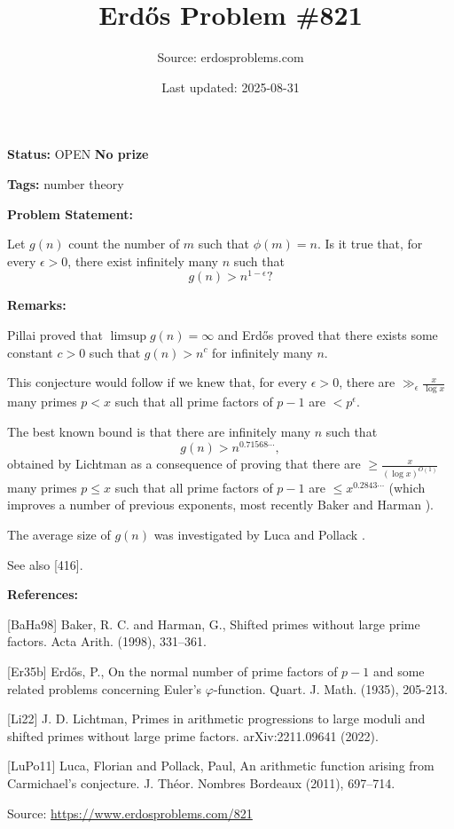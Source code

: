 \documentclass{article}
\title{Erd\H{o}s Problem \#821}
\date{Last updated: 2025-08-31}
\author{Source: erdosproblems.com}
\begin{document}
\maketitle

\noindent\textbf{Status:} OPEN \quad \textbf{No prize}

\noindent\textbf{Tags:} number theory

\medskip
\noindent\textbf{Problem Statement:}

Let $g(n)$ count the number of $m$ such that $\phi(m)=n$. Is it true that, for every $\epsilon>0$, there exist infinitely many $n$ such that\[g(n) > n^{1-\epsilon}?\]

\bigskip
\noindent\textbf{Remarks:}

Pillai proved that $\limsup g(n)=\infty$ and Erd\H{o}s \cite{Er35b} proved that there exists some constant $c>0$ such that $g(n) >n^c$ for infinitely many $n$.

This conjecture would follow if we knew that, for every $\epsilon>0$, there are $\gg_\epsilon \frac{x}{\log x}$ many primes $p<x$ such that all prime factors of $p-1$ are $<p^\epsilon$.

The best known bound is that there are infinitely many $n$ such that\[g(n) > n^{0.71568\cdots},\]obtained by Lichtman \cite{Li22} as a consequence of proving that there are $\geq \frac{x}{(\log x)^{O(1)}}$ many primes $p\leq x$ such that all prime factors of $p-1$ are $\leq x^{0.2843\cdots}$ (which improves a number of previous exponents, most recently Baker and Harman \cite{BaHa98}).

The average size of $g(n)$ was investigated by Luca and Pollack \cite{LuPo11}.

See also [416].

\bigskip
\noindent\textbf{References:}

[BaHa98] Baker, R. C. and Harman, G., Shifted primes without large prime factors. Acta Arith. (1998), 331--361.
 
 [Er35b] Erd\H{o}s, P., On the normal number of prime factors of $p-1$ and some related problems concerning Euler's $\varphi$-function. Quart. J. Math. (1935), 205-213.
 
 [Li22] J. D. Lichtman, Primes in arithmetic progressions to large moduli and shifted primes without large prime factors. arXiv:2211.09641 (2022).
 
 [LuPo11] Luca, Florian and Pollack, Paul, An arithmetic function arising from {C}armichael's conjecture. J. Th\'{e}or. Nombres Bordeaux (2011), 697--714.

\bigskip
\noindent\small{Source: \url{https://www.erdosproblems.com/821}}
\end{document}

